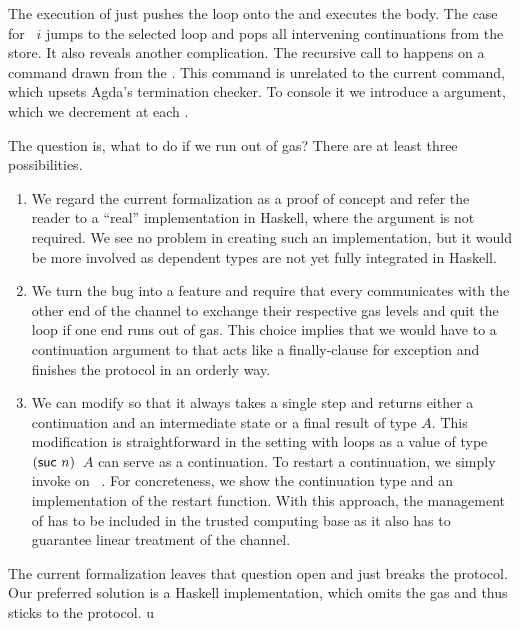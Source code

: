 \documentclass[acmsmall,screen,anonymous,review]{acmart}
\begin{document}
\rstExecutorSignature\vspace{-1.5\baselineskip}
\rstExecutor

The execution of {\AMU} just pushes the loop onto the
{\ACommandStore} and executes the body.
The case for {\ACONTINUE~$i$} jumps to the selected loop and pops
all intervening continuations from the store. It also reveals another complication. The recursive
call to {\Aexecutor} happens on a command drawn from the {\ACommandStore}. This
command is unrelated to the current command, which upsets Agda's
termination checker. To console it we introduce a 
argument, which we decrement at each {\ACONTINUE}.

The question is, what to do if we run out of gas?
There are at least three possibilities.
\begin{enumerate}
\item We regard the current formalization as a proof of concept and
  refer the reader to a ``real'' implementation in Haskell, where the
   argument is not required. We see no
  problem in creating such an implementation, but it would be more
  involved as dependent types are not yet fully integrated in Haskell.
\item We turn the bug into a feature and require that every
  {\ACONTINUE} communicates with the other end of the channel to
  exchange their respective gas levels and quit the loop if one end
  runs out of gas. This choice implies that we would have to a
  continuation argument to  {\ACONTINUE} that acts like a
  finally-clause for exception and finishes the protocol in an orderly
  way.
\item We can modify {\Aexecutor} so that it always takes a single step
  and returns either a continuation and an intermediate state or a
  final result of type $A$. This modification is straightforward in 
  the setting with loops as a value  of type {\ACommandStore~$(\Asuc~n)$~$A$}
  can serve as a continuation. To restart a continuation, we simply invoke
  {\Aexecutor} on ~\Azero. For concreteness, we show
  the continuation type and an implementation of the restart function.
  \rstAlternativeExecutorRestart
  With this approach, the management of {\Arestart}  has to be
  included in the trusted computing base as it also has to guarantee linear treatment of
  the channel.
\end{enumerate}
The current formalization leaves that question open and just breaks
the protocol. Our preferred solution is a Haskell implementation,
which omits the gas and thus sticks to the protocol.
u
\end{document}
